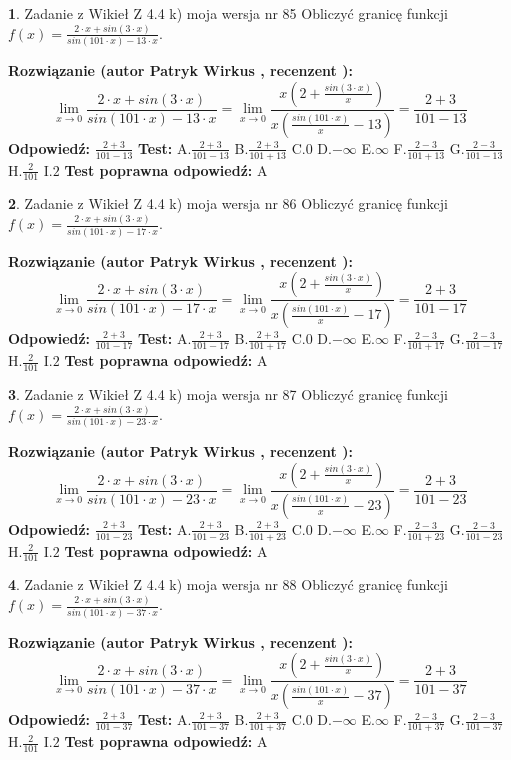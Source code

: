 \documentclass[12pt, a4paper]{article}
\theoremstyle{definition} %
\newtheorem{zad}{}
\newcommand{\zadStart}[1]{\begin{zad}#1\newline}
\newcommand{\zadStop}{\end{zad}}
\newcommand{\rozwStart}[2]{\noindent \textbf{Rozwiązanie (autor #1 , recenzent #2): }\newline}
\newcommand{\rozwStop}{\newline}
\newcommand{\odpStart}{\noindent \textbf{Odpowiedź:}\newline}
\newcommand{\odpStop}{\newline}
\newcommand{\testStart}{\noindent \textbf{Test:}\newline}
\newcommand{\testStop}{\newline}
\newcommand{\kluczStart}{\noindent \textbf{Test poprawna odpowiedź:}\newline}
\newcommand{\kluczStop}{\newline}
\begin{document}
\zadStart{Zadanie z Wikieł Z 4.4 k) moja wersja nr 85}
Obliczyć granicę funkcji $f(x)=\frac{2\cdot x +sin(3\cdot x)}{sin(101\cdot x) -13\cdot x}$.
\zadStop
\rozwStart{Patryk Wirkus}{}
$$\lim\limits_{x\to 0}\frac{2\cdot x +sin(3\cdot x)}{sin(101\cdot x) -13\cdot x}
=\lim\limits_{x\to 0}\frac{x(2+\frac{sin(3\cdot x)}{x})}{x(\frac{sin(101\cdot x)}{x}-13)}
=\frac{2+3}{101-13}$$
\rozwStop
\odpStart
$\frac{2+3}{101-13}$
\odpStop
\testStart
A.$\frac{2+3}{101-13}$
B.$\frac{2+3}{101+13}$
C.$0$
D.$-\infty$
E.$\infty$
F.$\frac{2-3}{101+13}$
G.$\frac{2-3}{101-13}$
H.$\frac{2}{101}$
I.$2$
\testStop
\kluczStart
A
\kluczStop



\zadStart{Zadanie z Wikieł Z 4.4 k) moja wersja nr 86}
Obliczyć granicę funkcji $f(x)=\frac{2\cdot x +sin(3\cdot x)}{sin(101\cdot x) -17\cdot x}$.
\zadStop
\rozwStart{Patryk Wirkus}{}
$$\lim\limits_{x\to 0}\frac{2\cdot x +sin(3\cdot x)}{sin(101\cdot x) -17\cdot x}
=\lim\limits_{x\to 0}\frac{x(2+\frac{sin(3\cdot x)}{x})}{x(\frac{sin(101\cdot x)}{x}-17)}
=\frac{2+3}{101-17}$$
\rozwStop
\odpStart
$\frac{2+3}{101-17}$
\odpStop
\testStart
A.$\frac{2+3}{101-17}$
B.$\frac{2+3}{101+17}$
C.$0$
D.$-\infty$
E.$\infty$
F.$\frac{2-3}{101+17}$
G.$\frac{2-3}{101-17}$
H.$\frac{2}{101}$
I.$2$
\testStop
\kluczStart
A
\kluczStop



\zadStart{Zadanie z Wikieł Z 4.4 k) moja wersja nr 87}
Obliczyć granicę funkcji $f(x)=\frac{2\cdot x +sin(3\cdot x)}{sin(101\cdot x) -23\cdot x}$.
\zadStop
\rozwStart{Patryk Wirkus}{}
$$\lim\limits_{x\to 0}\frac{2\cdot x +sin(3\cdot x)}{sin(101\cdot x) -23\cdot x}
=\lim\limits_{x\to 0}\frac{x(2+\frac{sin(3\cdot x)}{x})}{x(\frac{sin(101\cdot x)}{x}-23)}
=\frac{2+3}{101-23}$$
\rozwStop
\odpStart
$\frac{2+3}{101-23}$
\odpStop
\testStart
A.$\frac{2+3}{101-23}$
B.$\frac{2+3}{101+23}$
C.$0$
D.$-\infty$
E.$\infty$
F.$\frac{2-3}{101+23}$
G.$\frac{2-3}{101-23}$
H.$\frac{2}{101}$
I.$2$
\testStop
\kluczStart
A
\kluczStop



\zadStart{Zadanie z Wikieł Z 4.4 k) moja wersja nr 88}
Obliczyć granicę funkcji $f(x)=\frac{2\cdot x +sin(3\cdot x)}{sin(101\cdot x) -37\cdot x}$.
\zadStop
\rozwStart{Patryk Wirkus}{}
$$\lim\limits_{x\to 0}\frac{2\cdot x +sin(3\cdot x)}{sin(101\cdot x) -37\cdot x}
=\lim\limits_{x\to 0}\frac{x(2+\frac{sin(3\cdot x)}{x})}{x(\frac{sin(101\cdot x)}{x}-37)}
=\frac{2+3}{101-37}$$
\rozwStop
\odpStart
$\frac{2+3}{101-37}$
\odpStop
\testStart
A.$\frac{2+3}{101-37}$
B.$\frac{2+3}{101+37}$
C.$0$
D.$-\infty$
E.$\infty$
F.$\frac{2-3}{101+37}$
G.$\frac{2-3}{101-37}$
H.$\frac{2}{101}$
I.$2$
\testStop
\kluczStart
A
\kluczStop
\end{document}
